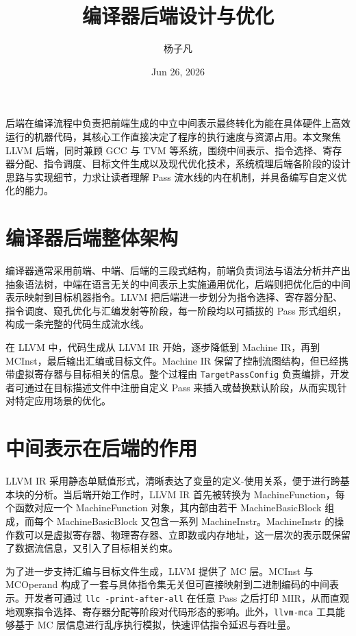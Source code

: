 \title{编译器后端设计与优化}
\author{杨子凡}
\date{Jun 26, 2026}
\maketitle
后端在编译流程中负责把前端生成的中立中间表示最终转化为能在具体硬件上高效运行的机器代码，其核心工作直接决定了程序的执行速度与资源占用。本文聚焦 LLVM 后端，同时兼顾 GCC 与 TVM 等系统，围绕中间表示、指令选择、寄存器分配、指令调度、目标文件生成以及现代优化技术，系统梳理后端各阶段的设计思路与实现细节，力求让读者理解 Pass 流水线的内在机制，并具备编写自定义优化的能力。\par
\chapter{编译器后端整体架构}
编译器通常采用前端、中端、后端的三段式结构，前端负责词法与语法分析并产出抽象语法树，中端在语言无关的中间表示上实施通用优化，后端则把优化后的中间表示映射到目标机器指令。LLVM 把后端进一步划分为指令选择、寄存器分配、指令调度、窥孔优化与汇编发射等阶段，每一阶段均以可插拔的 Pass 形式组织，构成一条完整的代码生成流水线。\par
在 LLVM 中，代码生成从 LLVM IR 开始，逐步降低到 Machine IR，再到 MCInst，最后输出汇编或目标文件。Machine IR 保留了控制流图结构，但已经携带虚拟寄存器与目标相关的信息。整个过程由 \texttt{TargetPassConfig} 负责编排，开发者可通过在目标描述文件中注册自定义 Pass 来插入或替换默认阶段，从而实现针对特定应用场景的优化。\par
\chapter{中间表示在后端的作用}
LLVM IR 采用静态单赋值形式，清晰表达了变量的定义-使用关系，便于进行跨基本块的分析。当后端开始工作时，LLVM IR 首先被转换为 MachineFunction，每个函数对应一个 MachineFunction 对象，其内部由若干 MachineBasicBlock 组成，而每个 MachineBasicBlock 又包含一系列 MachineInstr。MachineInstr 的操作数可以是虚拟寄存器、物理寄存器、立即数或内存地址，这一层次的表示既保留了数据流信息，又引入了目标相关约束。\par
为了进一步支持汇编与目标文件生成，LLVM 提供了 MC 层。MCInst 与 MCOperand 构成了一套与具体指令集无关但可直接映射到二进制编码的中间表示。开发者可通过 \texttt{llc -print-after-all} 在任意 Pass 之后打印 MIR，从而直观地观察指令选择、寄存器分配等阶段对代码形态的影响。此外，\texttt{llvm-mca} 工具能够基于 MC 层信息进行乱序执行模拟，快速评估指令延迟与吞吐量。\par
